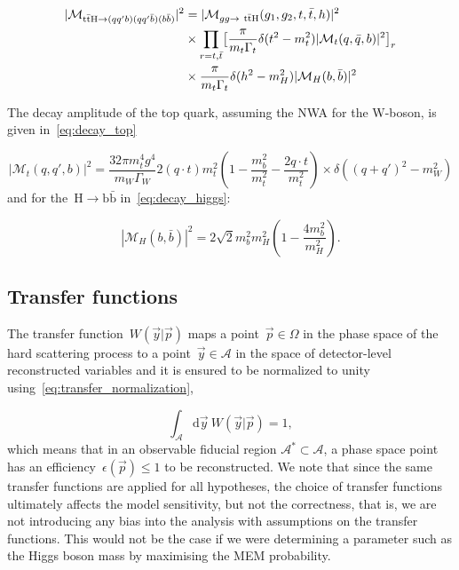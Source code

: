 \begin{align}
\label{eq:scattering_nwa}
|\mathcal{M}_{\mathrm{t} \bar{\mathrm{t}} \mathrm{H} \rightarrow (qq'b) (qq'\bar{b}) (b\bar{b})}|^2 &= |\mathcal{M}_{gg \rightarrow~\mathrm{t} \bar{\mathrm{t}} \mathrm{H}}(g_1, g_2, t, \bar{t}, h)|^2 \\
&\times \prod_{r = t,\bar{t}} \bigl[ \frac{\pi}{m_t \Gamma_t} \delta(t^2 - m_t^2) |\mathcal{M}_t(q,\bar{q},b)|^2 \bigr]_r \\
&\times \frac{\pi}{m_t \Gamma_t} \delta(h^2 - m_H^2) |\mathcal{M}_H(b,\bar{b})|^2
\end{align}

The decay amplitude of the top quark, assuming the NWA for the W-boson, is given in~\cref{eq:decay_top}

\begin{equation}
\label{eq:decay_top}
|\mathcal{M}_t(q,q',b)|^2 = \frac{32\pi m_t^4 g^4}{m_W \Gamma_W} {2 (q\cdot t)}{m_t^2} (1 - \frac{m_b^2}{m_t^2} - \frac{2 q \cdot t}{m_t^2}) \times \delta((q+q')^2 - m_W^2)
\end{equation}
and for the~$\mathrm{H} \rightarrow \mathrm{b}\bar{\mathrm{b}}$ in~\cref{eq:decay_higgs}:

\begin{equation}
\label{eq:decay_higgs}
|\mathcal{M}_H(b,\bar{b})|^2 = 2\sqrt{2} m_b^2 m_H^2 (1 - \frac{4m_b^2}{m_H^2}).
\end{equation}

\subsection{Transfer functions}
\label{sec:transfer_functions}

The transfer function~$W(\vec{y} | \vec{p})$ maps a point~$\vec{p} \in \Omega$ in the phase space of the hard scattering process to a point~$\vec{y} \in \mathcal{A}$ in the space of detector-level reconstructed variables and it is ensured to be normalized to unity using~\cref{eq:transfer_normalization},

\begin{equation}
\label{eq:transfer_normalization}
\int_{\mathcal{A}} \mathrm{d}\vec{y}~W(\vec{y} | \vec{p}) = 1,
\end{equation}
which means that in an observable fiducial region $\mathcal{A}^* \subset \mathcal{A}$, a phase space point has an efficiency~$\epsilon(\vec{p}) \leq 1$ to be reconstructed. We note that since the same transfer functions are applied for all hypotheses, the choice of transfer functions ultimately affects the model sensitivity, but not the correctness, that is, we are not introducing any bias into the analysis with assumptions on the transfer functions. This would not be the case if we were determining a parameter such as the Higgs boson mass by maximising the MEM probability.

